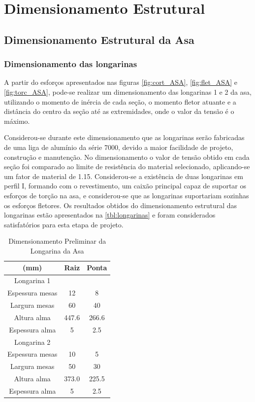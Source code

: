 \chapter{Dimensionamento Estrutural}

\section{Dimensionamento Estrutural da Asa}

\subsection{Dimensionamento das longarinas}
A partir do esforços apresentados nas figuras \ref{fig:cort_ASA}, \ref{fig:flet_ASA} e \ref{fig:torc_ASA}, pode-se realizar um dimensionamento das longarinas 1 e 2 da asa, utilizando o momento de inércia de cada seção, o momento fletor atuante e a distância do centro da seção até as extremidades, onde o valor da tensão é o máximo.

Considerou-se durante este dimensionamento que as longarinas serão fabricadas de uma liga de alumínio da série 7000, devido a maior facilidade de projeto, construção e manutenção. No dimensionamento o valor de tensão obtido em cada seção foi comparado ao limite de resistência do material selecionado, aplicando-se um fator de material de 1.15.
Considerou-se a existência de duas longarinas em perfil I, formando com o revestimento, um caixão principal capaz de suportar os esforços de torção na asa, e considerou-se que as longarinas suportariam sozinhas os esforços fletores.
Os resultados obtidos do dimensionamento estrutural das longarinas estão apresentados na \autoref{tbl:longarinas} e foram considerados satisfatórios para esta etapa de projeto.


\begin{table}[H]
\centering
\begin{tabular}{ccc}
\toprule
(mm) & Raiz & Ponta \\ \midrule
Longarina 1 &  &   \\ \midrule
Espessura mesas & 12 & 8 \\
Largura mesas & 60 & 40\\
Altura alma & 447.6 & 266.6 \\
Espessura alma & 5 & 2.5 \\ \midrule
Longarina 2 &  &   \\ \midrule
Espessura mesas & 10 & 5 \\
Largura mesas & 50 & 30 \\
Altura alma & 373.0 & 225.5 \\
Espessura alma & 5 & 2.5 \\
\bottomrule
\end{tabular}
\caption{Dimensionamento Preliminar da Longarina da Asa}
\label{tbl:longarinas2}
\end{table}


